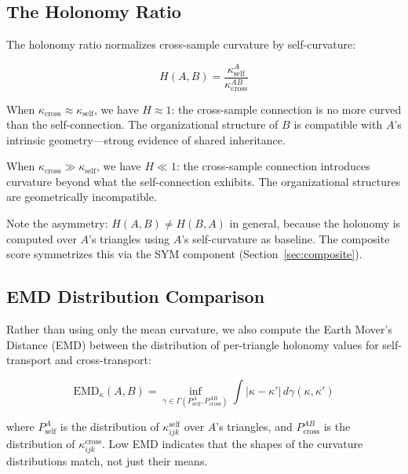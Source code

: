 \documentclass{../yalumba}
\begin{document}
\subsection{The Holonomy Ratio}

The holonomy ratio normalizes cross-sample curvature by self-curvature:

\begin{equation}
  H(A, B) = \frac{\kappa_{\text{self}}^A}{\kappa_{\text{cross}}^{AB}}
  \label{eq:holonomy-ratio}
\end{equation}

When $\kappa_{\text{cross}} \approx \kappa_{\text{self}}$, we have
$H \approx 1$: the cross-sample connection is no more curved than the
self-connection.  The organizational structure of $B$ is compatible with
$A$'s intrinsic geometry---strong evidence of shared inheritance.

When $\kappa_{\text{cross}} \gg \kappa_{\text{self}}$, we have $H \ll 1$:
the cross-sample connection introduces curvature beyond what the self-connection
exhibits.  The organizational structures are geometrically incompatible.


Note the asymmetry: $H(A, B) \neq H(B, A)$ in general, because the
holonomy is computed over $A$'s triangles using $A$'s self-curvature as
baseline.  The composite score symmetrizes this via the SYM component
(Section~\ref{sec:composite}).

\subsection{EMD Distribution Comparison}

Rather than using only the mean curvature, we also compute the Earth
Mover's Distance (EMD) between the distribution of per-triangle holonomy
values for self-transport and cross-transport:

\begin{equation}
  \text{EMD}_\kappa(A, B) = \inf_{\gamma \in \Gamma(P_{\text{self}}^A,
    P_{\text{cross}}^{AB})} \int |\kappa - \kappa'|\, d\gamma(\kappa, \kappa')
  \label{eq:emd}
\end{equation}

where $P_{\text{self}}^A$ is the distribution of $\kappa_{ijk}^{\text{self}}$
over $A$'s triangles, and $P_{\text{cross}}^{AB}$ is the distribution of
$\kappa_{ijk}^{\text{cross}}$.  Low EMD indicates that the shapes of the
curvature distributions match, not just their means.
\end{document}
